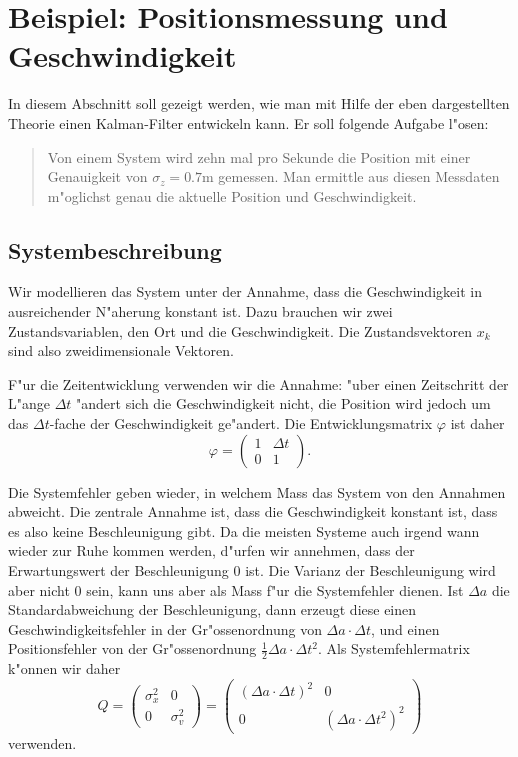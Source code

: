 \section{Beispiel: Positionsmessung und Geschwindigkeit}
In diesem Abschnitt soll gezeigt werden, wie man mit Hilfe der
eben dargestellten Theorie einen Kalman-Filter entwickeln kann.
Er soll folgende Aufgabe l"osen:
\begin{quote}
Von einem System wird zehn mal
pro Sekunde die Position mit einer Genauigkeit von $\sigma_z=0.7\text{m}$
gemessen.
Man ermittle aus diesen Messdaten m"oglichst genau die aktuelle Position
und Geschwindigkeit.
\end{quote}
\subsection{Systembeschreibung}
Wir modellieren das System unter der Annahme, dass die Geschwindigkeit in
ausreichender N"aherung konstant ist.
Dazu brauchen wir zwei Zustandsvariablen, den Ort und die Geschwindigkeit.
Die Zustandsvektoren $x_k$ sind also zweidimensionale Vektoren.

F"ur die Zeitentwicklung verwenden wir die Annahme: "uber einen Zeitschritt
der L"ange $\Delta t$
"andert sich die Geschwindigkeit nicht, die Position wird jedoch 
um das $\Delta t$-fache der Geschwindigkeit ge"andert.
Die Entwicklungsmatrix $\varphi$ ist daher
\[
\varphi=\begin{pmatrix}
1&\Delta t\\
0&1
\end{pmatrix}.
\]

Die Systemfehler geben wieder, in welchem Mass das System von den Annahmen
abweicht.
Die zentrale Annahme ist, dass die Geschwindigkeit konstant ist, dass es
also keine Beschleunigung gibt.
Da die meisten Systeme auch irgend wann wieder zur Ruhe kommen werden,
d"urfen wir annehmen, dass der Erwartungswert der Beschleunigung $0$ ist.
Die Varianz der Beschleunigung wird aber nicht 0 sein, kann uns aber als
Mass f"ur die Systemfehler dienen.
Ist $\Delta a$ die Standardabweichung der Beschleunigung, dann erzeugt
diese einen Geschwindigkeitsfehler in der Gr"ossenordnung von
$\Delta a\cdot \Delta t$, und einen Positionsfehler von der Gr"ossenordnung
$\frac12\Delta a\cdot\Delta t^2$.
Als Systemfehlermatrix k"onnen wir daher 
\[
Q=
\begin{pmatrix}
\sigma_x^2&0\\
0&\sigma_v^2
\end{pmatrix}
=
\begin{pmatrix}
(\Delta a\cdot\Delta t)^2&0\\
0&(\Delta a\cdot\Delta t^2)^2
\end{pmatrix}
\]
verwenden.

